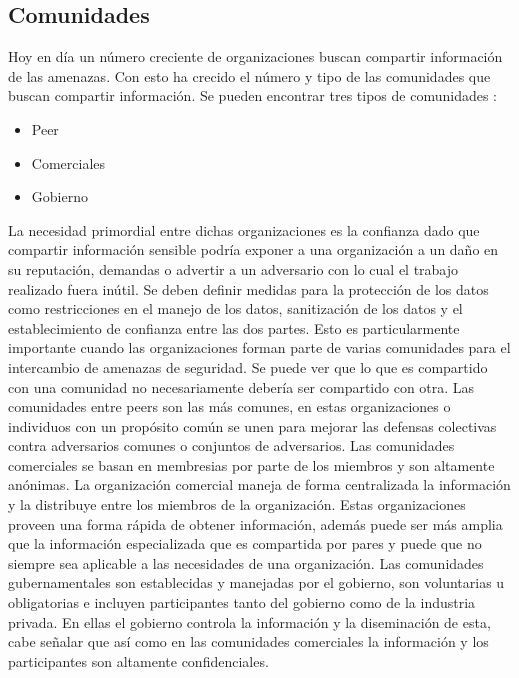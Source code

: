 \subsection{Comunidades}
Hoy en día un número creciente de organizaciones buscan compartir información de 
las amenazas. Con esto ha crecido el número y tipo de las comunidades que buscan 
compartir información. Se pueden encontrar tres tipos de comunidades :
\begin{itemize}
  \item Peer
  \item Comerciales
  \item Gobierno
\end{itemize}
La necesidad primordial entre dichas organizaciones es la confianza dado que 
compartir información sensible podría exponer a una organización a un daño en su 
reputación, demandas o advertir a un adversario con lo cual el trabajo realizado 
fuera inútil. Se deben definir medidas para la protección de los datos como 
restricciones en el manejo de los datos, sanitización de los datos y el 
establecimiento de confianza entre las dos partes. Esto es particularmente 
importante cuando las organizaciones forman parte de varias comunidades para el 
intercambio de amenazas de seguridad. Se puede ver que lo que es compartido con 
una comunidad no necesariamente debería ser compartido con otra.
Las comunidades entre peers son las más comunes, en estas organizaciones o 
individuos con un propósito común se unen para mejorar las defensas colectivas 
contra adversarios comunes o conjuntos de adversarios.
Las comunidades comerciales se basan en membresias por parte de los miembros y 
son altamente anónimas. La organización comercial maneja de forma centralizada 
la información y la distribuye entre los miembros de la organización. Estas 
organizaciones proveen una forma rápida de obtener información, además puede ser 
más amplia que la información especializada que es compartida por pares y puede 
que no siempre sea aplicable a las necesidades de una organización.
Las comunidades gubernamentales  son establecidas y manejadas por el gobierno, 
son voluntarias u obligatorias e incluyen participantes tanto del gobierno como 
de la industria privada. En ellas el gobierno controla la información y la 
diseminación de esta, cabe señalar que así como en las comunidades comerciales 
la información y los participantes son altamente confidenciales.

